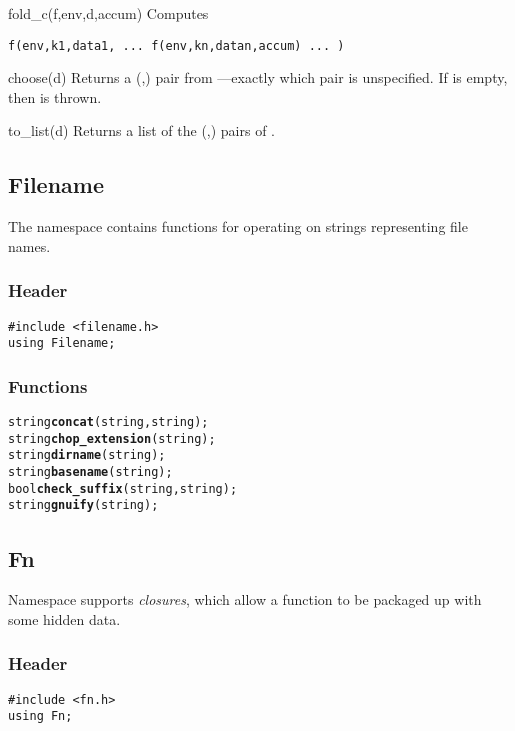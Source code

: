 \begin{defun}{fold_c}{(f,env,d,accum)}
Computes

\begin{verbatim}
f(env,k1,data1, ... f(env,kn,datan,accum) ... )
\end{verbatim}
\end{defun}

\begin{defun}{choose}{(d)}
Returns a (,) pair from ---exactly which pair
is unspecified.  If  is empty, then  is thrown.
\end{defun}

\begin{defun}{to_list}{(d)}
Returns a list of the (,) pairs of .
\end{defun}

\subsection{Filename}

The  namespace contains functions for operating on
strings representing file names.

\subsubsection*{Header}
\begin{verbatim}
#include <filename.h>
using Filename;
\end{verbatim}

\subsubsection*{Functions}
\begin{alltt}
string \textbf{concat}(string, string);
string \textbf{chop_extension}(string);
string \textbf{dirname}(string);
string \textbf{basename}(string);
bool   \textbf{check_suffix}(string, string);
string \textbf{gnuify}(string);
\end{alltt}

\subsection{Fn}

Namespace  supports \emph{closures}, which allow a function to
be packaged up with some hidden data.

\subsubsection*{Header}
\begin{verbatim}
#include <fn.h>
using Fn;
\end{verbatim}

